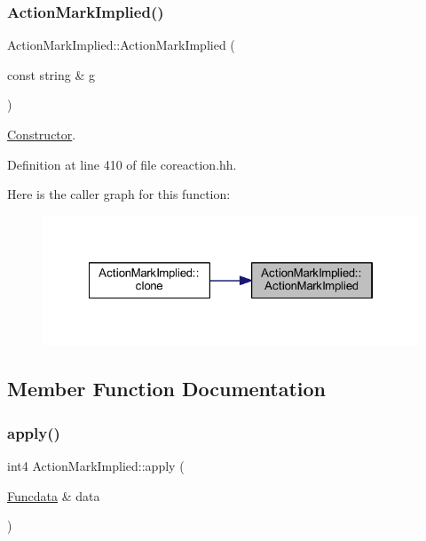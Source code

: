 \subsubsection{\texorpdfstring{ActionMarkImplied()}{ActionMarkImplied()}}
{\footnotesize\ttfamily Action\+Mark\+Implied\+::\+Action\+Mark\+Implied (\begin{DoxyParamCaption}\item[{const string \&}]{g }\end{DoxyParamCaption})\hspace{0.3cm}{\ttfamily [inline]}}



\mbox{\hyperlink{class_constructor}{Constructor}}. 



Definition at line 410 of file coreaction.\+hh.

Here is the caller graph for this function\+:
\nopagebreak
\begin{figure}[H]
\begin{center}
\leavevmode
\includegraphics[width=322pt]{class_action_mark_implied_a3456828839f9239d2b89058d30c54444_icgraph}
\end{center}
\end{figure}


\subsection{Member Function Documentation}
\mbox{\label{class_action_mark_implied_a775f99086570c42e2bc89de67bbc9867}} 
\subsubsection{\texorpdfstring{apply()}{apply()}}
{\footnotesize\ttfamily int4 Action\+Mark\+Implied\+::apply (\begin{DoxyParamCaption}\item[{\mbox{\hyperlink{class_funcdata}{Funcdata}} \&}]{data }\end{DoxyParamCaption})\hspace{0.3cm}{\ttfamily [virtual]}}



